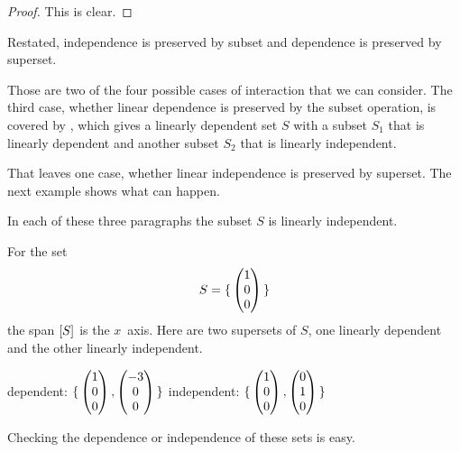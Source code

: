\begin{proof}
This is clear.
\end{proof}

Restated, independence is preserved by subset 
and dependence is preserved by superset.

Those are two of the four possible cases of interaction that we can consider.
The third case, whether linear dependence is preserved by the subset operation,
is covered by , which gives
a linearly dependent set $S$ with a subset $S_1$ 
that is linearly dependent and another subset $S_2$
that is linearly independent.

That leaves one case, whether linear independence is preserved by superset.
The next example shows what can happen.

\begin{example} \label{ex:LinindSetsAndSuper}
In each of these three paragraphs
the subset $S$ is linearly independent.

For the set
\begin{equation*}
  S
   =\mbox{$\{\,\begin{pmatrix} 1 \\ 0 \\ 0 \end{pmatrix}\,\}$}
\end{equation*}
the span \( \relax [S\relax ] \) is the \( x \)~axis.
Here are two supersets of $S$, one linearly dependent and the other linearly
independent.
\begin{center}
     dependent:
     \( \mbox{$\{\,
         \begin{pmatrix} 1 \\ 0 \\ 0 \end{pmatrix},
         \begin{pmatrix} -3 \\ 0 \\ 0 \end{pmatrix}\,\}$} \)      
     \qquad
     independent:
     \( \mbox{$\{\,
         \begin{pmatrix} 1 \\ 0 \\ 0 \end{pmatrix},
         \begin{pmatrix} 0 \\ 1 \\ 0 \end{pmatrix}\,\}$} \)      
\end{center}
Checking the dependence or independence of these sets is easy.


\end{example}

